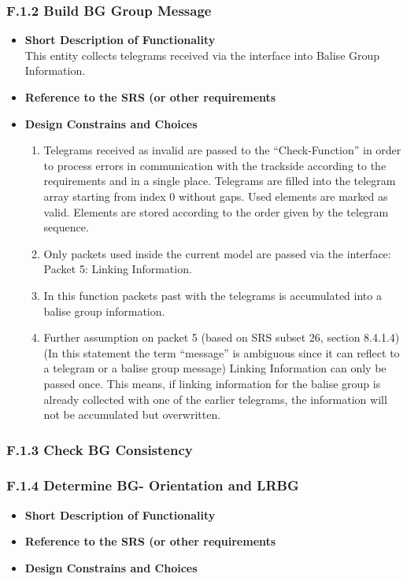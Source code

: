 \documentclass{template/openetcs_article}
\begin{document}
\subsubsection{F.1.2 Build BG Group Message}
\begin{itemize}
	\item \textbf{Short Description of Functionality}\\
	This entity collects telegrams received via the interface into Balise Group Information.
	\item \textbf{Reference to the SRS (or other requirements}\\
	\item \textbf{Design Constrains and Choices}\\
	\begin{enumerate}
		\item Telegrams received as invalid are passed to the ``Check-Function'' in order to process errors in communication with the trackside according to the requirements and in a single place.
		Telegrams are filled into the telegram array starting from index 0 without gaps. Used elements are marked as valid. Elements are stored according to the order given by the telegram sequence. 
		\item Only packets used inside the current model are passed via the interface:\\
		Packet 5: Linking Information.\\
		\item In this function packets past with the telegrams is accumulated into a balise group information.\\
		\item Further assumption on packet 5 (based on SRS subset 26, section 8.4.1.4)\\
		(In this statement the term ``message'' is ambiguous since it can reflect to a telegram or a balise group message)
		Linking Information can only be passed once. This means, if linking information for the balise group is already collected with one of the earlier telegrams, the information will not be accumulated but overwritten.\\
	\end{enumerate}
\end{itemize}

\subsubsection{F.1.3 Check BG Consistency}

\subsubsection{F.1.4 Determine BG- Orientation and LRBG}
\begin{itemize}
	\item \textbf{Short Description of Functionality}\\
	\item \textbf{Reference to the SRS (or other requirements}\\
	\item \textbf{Design Constrains and Choices}\\
\end{itemize}
\end{document}
